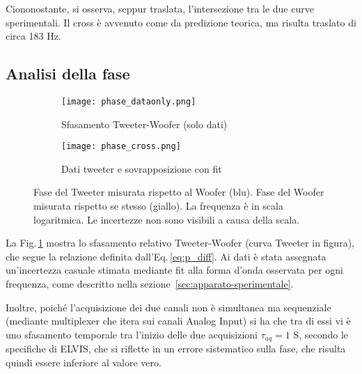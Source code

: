 \documentclass[../Relazione_circuiti]{subfiles}
\begin{document}
  Ciononostante, si osserva, seppur traslata, l'intersezione tra le due curve sperimentali. Il cross è avvenuto come da
  predizione teorica, ma risulta traslato di circa 183 Hz.

\subsection{Analisi della fase}

  \begin{figure}[H]
    \centering

    \begin{subfigure}{=0.49\textwidth}
      \centering
      \texttt{[image: phase\_dataonly.png]}
      \caption{Sfasamento Tweeter-Woofer (solo dati)}
      \label{fig:pdiff_dataonly}

    \end{subfigure}
    \hfill
    \begin{subfigure}{=0.49\textwidth}
      \centering
      \texttt{[image: phase\_cross.png]}
      \caption{Dati tweeter e sovrapposizione con fit}
      \label{fig:pdiff_fit_data}

    \end{subfigure}

    \caption{
      Fase del Tweeter misurata rispetto al Woofer (blu). Fase del Woofer misurata rispetto se stesso (giallo).
      La frequenza è in scala logaritmica. Le incertezze non sono visibili a causa della scala.
    }
    \label{fig:phase_diff}

  \end{figure}

  La Fig.\,\ref{fig:pdiff_dataonly} mostra lo sfasamento relativo Tweeter-Woofer (curva Tweeter in figura), che segue la relazione definita dall'Eq.\,\eqref{eq:p_diff}.
  Ai dati è stata assegnata un'incertezza casuale stimata mediante fit alla forma d'onda osservata per ogni frequenza,
  come descritto nella sezione~\ref{sec:apparato-sperimentale}.

  Inoltre, poiché l'acquisizione dei due canali non è simultanea ma sequenziale (mediante multiplexer che itera sui
  canali Analog Input) si ha che tra di essi vi è uno sfasamento temporale tra l'inizio delle due acquisizioni
  $\tau_{aq}=1$ \textmu S, secondo le specifiche di ELVIS, che si riflette in un errore
  sistematico sulla fase, che risulta quindi essere inferiore al valore vero.
\end{document}
